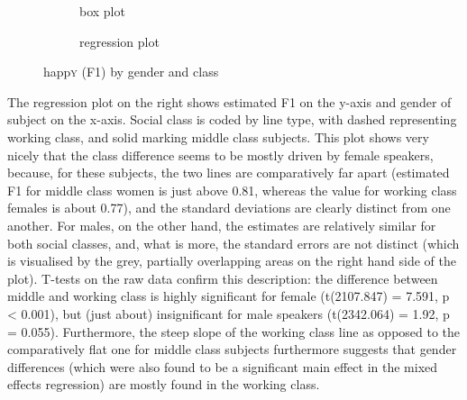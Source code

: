 	\begin{figure}[h!]
		\centering
		\begin{subfigure}{.49\textwidth}
			\centering
			\resizebox{\linewidth}{!}{} 
			\caption{box plot}
			\label{fig.box.f1w.happy.genderclass}
		\end{subfigure}
		\begin{subfigure}{.49\textwidth}
			\centering
			\resizebox{\linewidth}{!}{}
			\caption{regression plot}
			\label{fig.scatter.f1w.happy.genderclass}
		\end{subfigure}
		\caption{happ\textsc{y} (F1) by gender and class}
	\end{figure}

The regression plot on the right shows estimated F1 on the y-axis and gender of subject on the x-axis.
Social class is coded by line type, with dashed representing working class, and solid marking middle class subjects.
This plot shows very nicely that the class difference seems to be mostly driven by female speakers, because, for these subjects, the two lines are comparatively far apart (estimated F1 for middle class women is just above 0.81, whereas the value for working class females is about 0.77), and the standard deviations are clearly distinct from one another.
For males, on the other hand, the estimates are relatively similar for both social classes, and, what is more, the standard errors are not distinct (which is visualised by the grey, partially overlapping areas on the right hand side of the plot).
T-tests on the raw data confirm this description: the difference between middle and working class is highly significant for female (t(2107.847) = 7.591, p < 0.001), but (just about) insignificant for male speakers (t(2342.064) = 1.92, p = 0.055).
Furthermore, the steep slope of the working class line as opposed to the comparatively flat one for middle class subjects furthermore suggests that gender differences (which were also found to be a significant main effect in the mixed effects regression) are mostly found in the working class.


